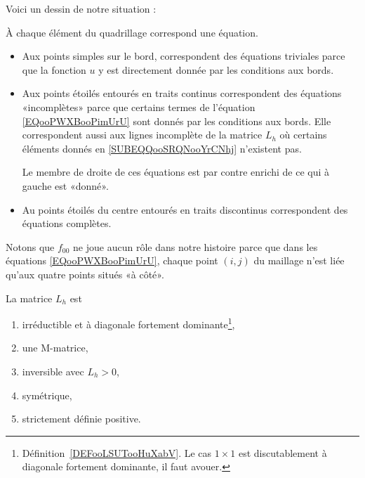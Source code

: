 Voici un dessin de notre situation :

\begin{center}
	
\end{center}

À chaque élément du quadrillage correspond une équation.
\begin{itemize}
	\item
	      Aux points simples sur le bord, correspondent des équations triviales parce que la fonction \(u \) y est directement donnée par les conditions aux bords.
	\item
	      Aux points étoilés entourés en traits continus correspondent des équations «incomplètes» parce que certains termes de l'équation \eqref{EQooPWXBooPimUrU} sont donnés par les conditions aux bords. Elle correspondent aussi aux lignes incomplète de la matrice \( L_h\) où certains éléments donnés en \eqref{SUBEQQooSRQNooYrCNhj} n'existent pas.

	      Le membre de droite de ces équations est par contre enrichi de ce qui à gauche est «donné».

	\item
	      Au points étoilés du centre entourés en traits discontinus correspondent des équations complètes.

\end{itemize}

Notons que \( f_{00}\) ne joue aucun rôle dans notre histoire parce que dans les équations \eqref{EQooPWXBooPimUrU}, chaque point \( (i,j)\) du maillage n'est liée qu'aux quatre points situés «à côté».


\begin{proposition} \label{PROPooWGTRooVjWhYY}
	La matrice \(L_h\) est
	\begin{enumerate}
		\item
		      irréductible et à diagonale fortement dominante\footnote{Définition~\ref{DEFooLSUTooHuXabV}. Le cas \( 1\times 1\) est discutablement à diagonale fortement dominante, il faut avouer.},
		\item       \label{ITEMooOOHPooDsvUPP}
		      une M-matrice,
		\item
		      inversible avec \( L_{h}>0\),
		\item
		      symétrique,
		\item
		      strictement définie positive.
	\end{enumerate}
\end{proposition}


